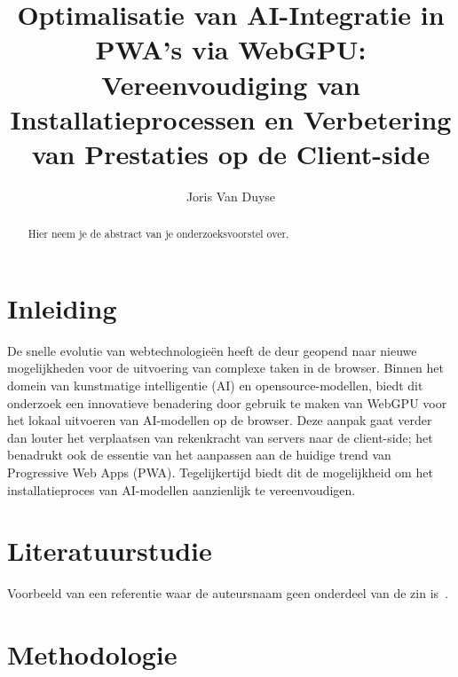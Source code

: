 \documentclass{hogent-article}
\title{Optimalisatie van AI-Integratie in PWA's via WebGPU: Vereenvoudiging van Installatieprocessen en Verbetering van Prestaties op de Client-side}
\author{Joris Van Duyse}
\begin{document}
\begin{abstract}
  Hier neem je de abstract van je onderzoeksvoorstel over.
\end{abstract}

\tableofcontents

\bigskip

\section{Inleiding}%
\label{sec:inleiding}

De snelle evolutie van webtechnologieën heeft de deur geopend naar nieuwe mogelijkheden voor de uitvoering van complexe taken in de browser. 
Binnen het domein van kunstmatige intelligentie (AI) en opensource-modellen, 
biedt dit onderzoek een innovatieve benadering door gebruik te maken van WebGPU voor het lokaal uitvoeren 
van AI-modellen op de browser. Deze aanpak gaat verder dan louter het verplaatsen van rekenkracht van servers naar de client-side; 
het benadrukt ook de essentie van het aanpassen aan de huidige trend van Progressive Web Apps (PWA). 
Tegelijkertijd biedt dit de mogelijkheid om het installatieproces van AI-modellen aanzienlijk te vereenvoudigen.


\section{Literatuurstudie}%
\label{sec:literatuurstudie}


Voorbeeld van een referentie waar de auteursnaam geen onderdeel van de zin is~\autocite{Moore2002}.


\section{Methodologie}%
\label{sec:methodologie}

\end{document}
